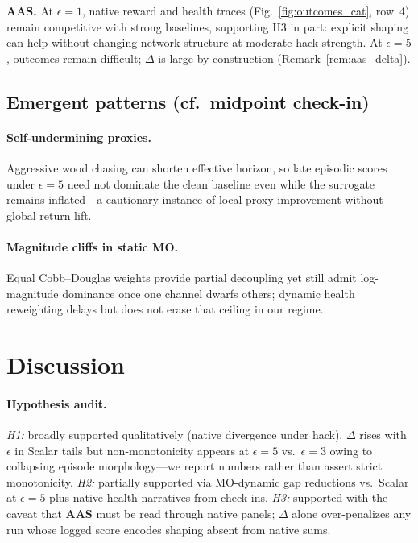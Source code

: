 \documentclass[10pt,twocolumn]{article}
\theoremstyle{definition}
\begin{document}
\textbf{AAS.} At \(\epsilon{=}1\), native reward and health traces (Fig.~\ref{fig:outcomes_cat}, row~4) remain competitive with strong baselines, supporting H3 in part: explicit shaping can help without changing network structure at moderate hack strength. At \(\epsilon{=}5\), outcomes remain difficult; \(\Delta\) is large by construction (Remark~\ref{rem:aas_delta}).

\subsection{Emergent patterns (cf.\ midpoint check-in)}
\paragraph{Self-undermining proxies.} Aggressive wood chasing can shorten effective horizon, so late episodic scores under \(\epsilon{=}5\) need not dominate the clean baseline even while the surrogate remains inflated---a cautionary instance of local proxy improvement without global return lift.
\paragraph{Magnitude cliffs in static MO.} Equal Cobb--Douglas weights provide partial decoupling yet still admit log-magnitude dominance once one channel dwarfs others; dynamic health reweighting delays but does not erase that ceiling in our regime.

\section{Discussion}
\paragraph{Hypothesis audit.}
\textit{H1:} broadly supported qualitatively (native divergence under hack). \(\Delta\) rises with \(\epsilon\) in Scalar tails but non-monotonicity appears at \(\epsilon{=}5\) vs.\ \(\epsilon{=}3\) owing to collapsing episode morphology---we report numbers rather than assert strict monotonicity.
\textit{H2:} partially supported via MO-dynamic gap reductions vs.\ Scalar at \(\epsilon{=}5\) plus native-health narratives from check-ins.
\textit{H3:} supported with the caveat that \textbf{AAS} must be read through native panels; \(\Delta\) alone over-penalizes any run whose logged score encodes shaping absent from native sums.
\end{document}
